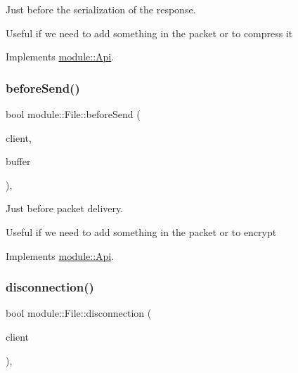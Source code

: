 Just before the serialization of the response. 

Useful if we need to add something in the packet or to compress it 

Implements \hyperlink{structmodule_1_1Api_a5293babe6b28a397b7a11f32da0a6f51}{module\+::\+Api}.

\mbox{\label{classmodule_1_1File_a13091749fbe954576d351e90e15581d7}} 
\subsubsection{\texorpdfstring{before\+Send()}{beforeSend()}}
{\footnotesize\ttfamily bool module\+::\+File\+::before\+Send (\begin{DoxyParamCaption}\item[{const \hyperlink{structnet_1_1IClient}{net\+::\+I\+Client} \&}]{client,  }\item[{std\+::string \&}]{buffer }\end{DoxyParamCaption})\hspace{0.3cm}{\ttfamily [virtual]}, {\ttfamily [noexcept]}}



Just before packet delivery. 

Useful if we need to add something in the packet or to encrypt 

Implements \hyperlink{structmodule_1_1Api_a71d1ada8bc5fc81fd71607315dd86185}{module\+::\+Api}.

\mbox{\label{classmodule_1_1File_a86bd2e04ae5946fb790342911b9e4454}} 
\subsubsection{\texorpdfstring{disconnection()}{disconnection()}}
{\footnotesize\ttfamily bool module\+::\+File\+::disconnection (\begin{DoxyParamCaption}\item[{const \hyperlink{structnet_1_1IClient}{net\+::\+I\+Client} \&}]{client }\end{DoxyParamCaption})\hspace{0.3cm}{\ttfamily [virtual]}, {\ttfamily [noexcept]}}



